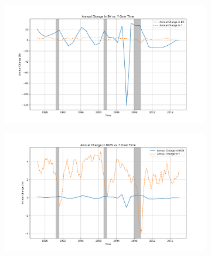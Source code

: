 \documentclass{article}
\begin{document}
\begin{figure}[H!]
\begin{subfigure}{0.45\textwidth}
  \centering
  \includegraphics[width=\linewidth]{BK_annual_change_vs_Y.png}
\end{subfigure}%
\hspace{0.05\textwidth} %
\begin{subfigure}{0.45\textwidth}
  \centering
  \includegraphics[width=\linewidth]{BK_N_annual_change_vs_Y.png}
\end{subfigure}
\end{figure}
\end{document}
